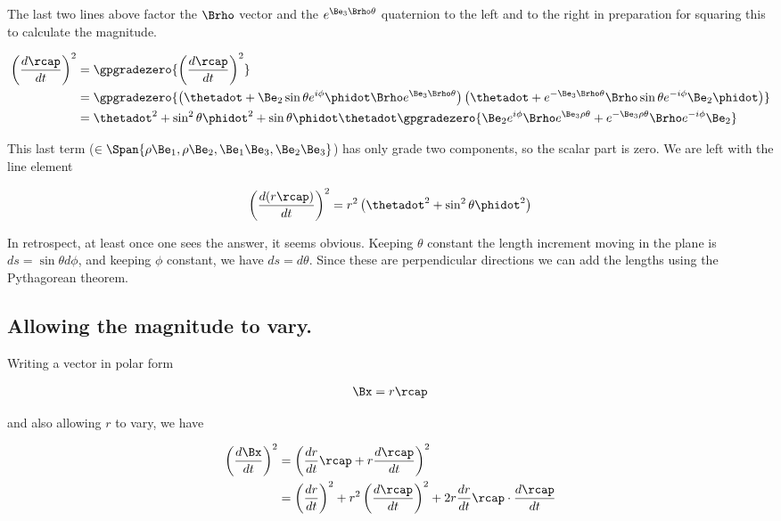 The last two lines above factor the $\Brho$ vector and the $e^{\Be_3 \Brho \theta}$ quaternion to the left and to the right in preparation for squaring this to calculate the magnitude.

\begin{align*}
\left( \frac{d\rcap}{dt} \right)^2
&=
\gpgradezero{ \left( \frac{d\rcap}{dt} \right)^2 } \\
&=
\gpgradezero{ 
\left( \thetadot + \Be_2 \sin\theta e^{i\phi} \phidot \Brho e^{\Be_3 \Brho \theta} \right) 
\left(\thetadot + e^{-\Be_3 \Brho \theta} \Brho \sin\theta e^{-i\phi} \Be_2 \phidot\right) } \\
&=
\thetadot^2 + \sin^2\theta \phidot^2
+ \sin\theta \phidot \thetadot
\gpgradezero{ 
\Be_2 e^{i\phi} \Brho e^{\Be_3 \rho \theta}
+e^{-\Be_3 \rho \theta} \Brho e^{-i\phi} \Be_2
} \\
\end{align*}

This last term ($\in \Span \{\rho\Be_1, \rho\Be_2, \Be_1\Be_3, \Be_2\Be_3\}$) has only grade two components, so the scalar part is zero.  We are left with the line element 

\begin{align}\label{eqn:sphericalPolarUnit:yoo4}
\left(\frac{d (r\rcap)}{dt}\right)^2 = r^2 \left( \thetadot^2 + \sin^2\theta \phidot^2 \right)
\end{align}

In retrospect, at least once one sees the answer, it seems obvious.  Keeping $\theta$ constant the length increment moving in the plane is $ds = \sin\theta d\phi$, and keeping $\phi$ constant, we have $ds = d\theta$.  Since these are perpendicular directions we can add the lengths using the Pythagorean theorem.

\subsection{Allowing the magnitude to vary.}

Writing a vector in polar form

\begin{align}\label{eqn:sphericalPolarUnit:xoo1}
\Bx = r \rcap
\end{align}

and also allowing $r$ to vary, we have

\begin{align*}
\left(\frac{d\Bx}{dt}\right)^2 
&= \left( \frac{dr}{dt} \rcap + r \frac{d\rcap}{dt} \right)^2 \\
&= 
\left( \frac{dr}{dt} \right)^2 + r^2 \left( \frac{d\rcap}{dt} \right)^2 
+ 2 r \frac{dr}{dt} \rcap \cdot \frac{d\rcap}{dt} 
\end{align*}

